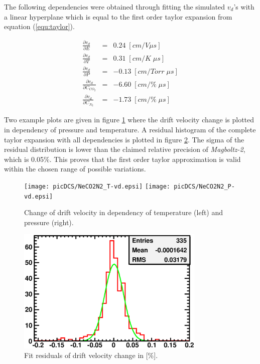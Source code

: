 \documentclass{elsart}
\begin{document}
The following dependencies were obtained through fitting the simulated $v_d$'s with a linear hyperplane which is equal to the first order taylor expansion from equation (\ref{equ:taylor}). 

\begin{eqnarray*}
  \frac{\partial v_d}{\partial E} & = & 0.24 \; [cm/V\mu s] \\
  \frac{\partial v_d}{\partial T} & = & 0.31 \; [cm/K\; \mu s]\\
  \frac{\partial v_d}{\partial P} & = & -0.13 \; [cm/Torr\; \mu s]\\
  \frac{\partial v_d}{\partial C_{CO_2}} & = & -6.60 \; [cm/\%\; \mu s]\\
  \frac{\partial v_d}{\partial C_{N_2}} & = & -1.73 \;[cm/\%\; \mu s]
\end{eqnarray*}


Two example plots are given in figure \ref{figVDdepend} where the drift velocity change is plotted in dependency of pressure and temperature. A residual histogram of the complete taylor expansion with all dependencies is plotted in figure \ref{figResHistoSim}. The sigma of the residual distribution is lower than the claimed relative precision of \textsl{Magboltz-2}, which is 0.05\%. This proves that the first order taylor approximation is valid within the chosen range of possible variations.


\begin{figure}[t]
\centering
\texttt{[image: picDCS/NeCO2N2\_T-vd.epsi]}
\texttt{[image: picDCS/NeCO2N2\_P-vd.epsi]}
\caption{
Change of drift velocity in dependency of temperature (left) and pressure (right). } 
\label{figVDdepend}
\end{figure}

\begin{figure}[t]
\centering
\includegraphics[width=90mm]{picDCS/resHist.eps}
\caption{
Fit residuals of drift velocity change in [\%]. } 
\label{figResHistoSim}
\end{figure}
\end{document}
